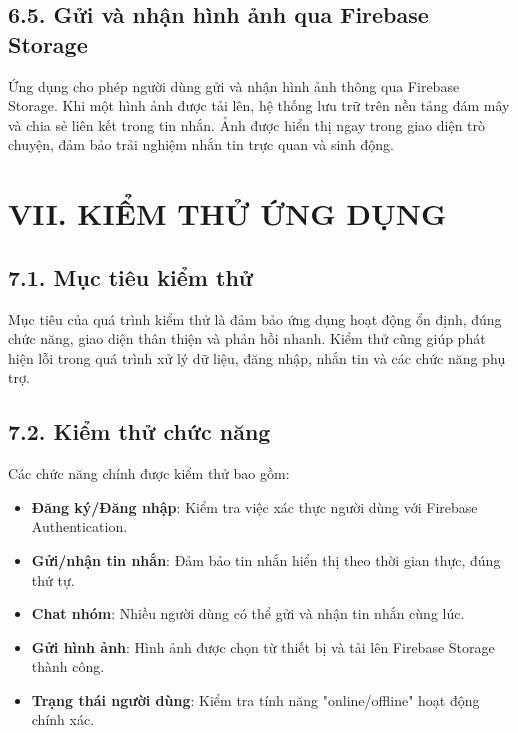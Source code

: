 \documentclass[12pt,a4paper]{article}
\begin{document}
	\subsection*{6.5. Gửi và nhận hình ảnh qua Firebase Storage}
	\vspace{0.1cm}
	
	\noindent
	Ứng dụng cho phép người dùng gửi và nhận hình ảnh thông qua Firebase Storage. Khi một hình ảnh được tải lên, hệ thống lưu trữ trên nền tảng đám mây và chia sẻ liên kết trong tin nhắn. Ảnh được hiển thị ngay trong giao diện trò chuyện, đảm bảo trải nghiệm nhắn tin trực quan và sinh động.
	
	\vspace{0.5cm}
	
	\section*{VII. KIỂM THỬ ỨNG DỤNG}
	\vspace{0.5cm}
	
	\subsection*{7.1. Mục tiêu kiểm thử}
	\vspace{0.1cm}
	
	\noindent
	Mục tiêu của quá trình kiểm thử là đảm bảo ứng dụng hoạt động ổn định, đúng chức năng, giao diện thân thiện và phản hồi nhanh. Kiểm thử cũng giúp phát hiện lỗi trong quá trình xử lý dữ liệu, đăng nhập, nhắn tin và các chức năng phụ trợ.
	
	\vspace{0.7cm}
	
	\subsection*{7.2. Kiểm thử chức năng}
	\vspace{0.1cm}
	
	\noindent
	Các chức năng chính được kiểm thử bao gồm:
	\begin{itemize}
		\item \textbf{Đăng ký/Đăng nhập}: Kiểm tra việc xác thực người dùng với Firebase Authentication.
		\item \textbf{Gửi/nhận tin nhắn}: Đảm bảo tin nhắn hiển thị theo thời gian thực, đúng thứ tự.
		\item \textbf{Chat nhóm}: Nhiều người dùng có thể gửi và nhận tin nhắn cùng lúc.
		\item \textbf{Gửi hình ảnh}: Hình ảnh được chọn từ thiết bị và tải lên Firebase Storage thành công.
		\item \textbf{Trạng thái người dùng}: Kiểm tra tính năng "online/offline" hoạt động chính xác.
	\end{itemize}
	
\end{document}

